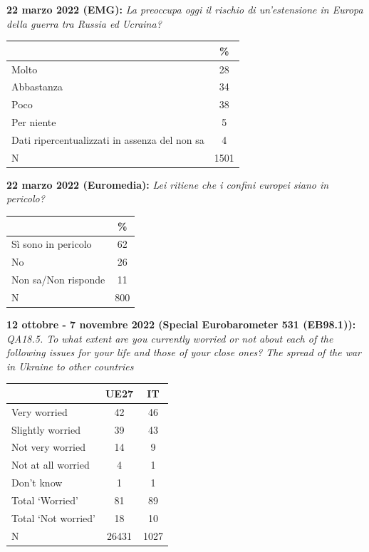 \documentclass[
]{book}
\begin{document}
\textbf{22 marzo 2022 (EMG):} \emph{La preoccupa oggi il rischio di un'estensione in Europa della guerra tra Russia ed Ucraina?}

\begin{longtable}[]{@{}lc@{}}
\toprule\noalign{}
& \% \\
\midrule\noalign{}
\endhead
\bottomrule\noalign{}
\endlastfoot
Molto & 28 \\
Abbastanza & 34 \\
Poco & 38 \\
Per niente & 5 \\
Dati ripercentualizzati in assenza del non sa & 4 \\
N & 1501 \\
\end{longtable}

\textbf{22 marzo 2022 (Euromedia):} \emph{Lei ritiene che i confini europei siano in pericolo?}

\begin{longtable}[]{@{}lc@{}}
\toprule\noalign{}
& \% \\
\midrule\noalign{}
\endhead
\bottomrule\noalign{}
\endlastfoot
Sì sono in pericolo & 62 \\
No & 26 \\
Non sa/Non risponde & 11 \\
N & 800 \\
\end{longtable}

\textbf{12 ottobre - 7 novembre 2022 (Special Eurobarometer 531 (EB98.1)):} \emph{QA18.5. To what extent are you currently worried or not about each of the following issues for your life and those of your close ones?}
\emph{The spread of the war in Ukraine to other countries}

\begin{longtable}[]{@{}lcc@{}}
\toprule\noalign{}
& UE27 & IT \\
\midrule\noalign{}
\endhead
\bottomrule\noalign{}
\endlastfoot
Very worried & 42 & 46 \\
Slightly worried & 39 & 43 \\
Not very worried & 14 & 9 \\
Not at all worried & 4 & 1 \\
Don't know & 1 & 1 \\
Total `Worried' & 81 & 89 \\
Total `Not worried' & 18 & 10 \\
N & 26431 & 1027 \\
\end{longtable}
\end{document}
